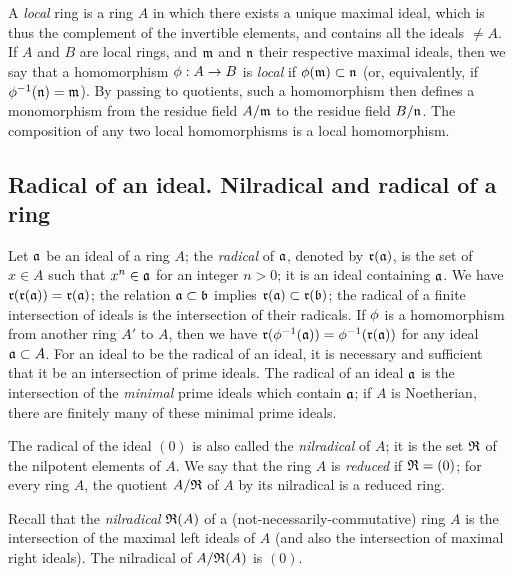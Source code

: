 \begin{env}[1.0.7]
\label{0.1.0.7}
A \emph{local} ring is a ring $A$ in which there exists a unique maximal ideal, which is thus the complement of the invertible elements, and contains all the ideals $\neq A$.
If $A$ and $B$ are local rings, and $\mathfrak{m}$ and $\mathfrak{n}$ their respective maximal ideals, then we say that a homomorphism $\vphi:A\to B$ is \emph{local} if $\phi(\mathfrak{m})\subset\mathfrak{n}$ (or, equivalently, if $\phi^{-1}(\mathfrak{n})=\mathfrak{m}$).
By passing to quotients, such a homomorphism then defines a monomorphism from the residue field $A/\mathfrak{m}$ to the residue field $B/\mathfrak{n}$.
The composition of any two local homomorphisms is a local homomorphism.
\end{env}

\subsection{Radical of an ideal. Nilradical and radical of a ring}
\label{subsection:radical-and-nilradical}

\begin{env}[1.1.1]
\label{0.1.1.1}
Let $\mathfrak{a}$ be an ideal of a ring $A$;
the \emph{radical} of $\mathfrak{a}$, denoted by $\mathfrak{r}(\mathfrak{a})$, is the set of $x\in A$ such that $x^n\in\mathfrak{a}$ for an integer $n>0$;
it is an ideal containing $\mathfrak{a}$.
We have $\mathfrak{r}(\mathfrak{r}(\mathfrak{a}))=\mathfrak{r}(\mathfrak{a})$;
the relation $\mathfrak{a}\subset\mathfrak{b}$ implies $\mathfrak{r}(\mathfrak{a})\subset\mathfrak{r}(\mathfrak{b})$;
the radical of a finite intersection of ideals is the intersection of their radicals.
If $\phi$ is a homomorphism from another ring $A'$ to $A$, then we have $\mathfrak{r}(\phi^{-1}(\mathfrak{a}))=\phi^{-1}(\mathfrak{r}(\mathfrak{a}))$ for any ideal $\mathfrak{a}\subset A$.
For an ideal to be the radical of an ideal, it is necessary and sufficient that it be an intersection of prime ideals.
The radical of an ideal $\mathfrak{a}$ is the intersection of the \emph{minimal} prime ideals which contain $\mathfrak{a}$;
if $A$ is Noetherian, there are finitely many of these minimal prime ideals.

The radical of the ideal $(0)$ is also called the \emph{nilradical} of $A$;
it is the set $\mathfrak{R}$ of the nilpotent elements of $A$.
We say that the ring $A$ is \emph{reduced} if $\mathfrak{R}=(0)$;
for every ring $A$, the quotient $A/\mathfrak{R}$ of $A$ by its nilradical is a reduced ring.
\end{env}

\begin{env}[1.1.2]
\label{0.1.1.2}
Recall that the \emph{nilradical} $\mathfrak{R}(A)$ of a (not-necessarily-commutative) ring $A$ is the intersection of the maximal left ideals of $A$ (and also the intersection of maximal right ideals).
The nilradical of $A/\mathfrak{R}(A)$ is $(0)$.
\end{env}

